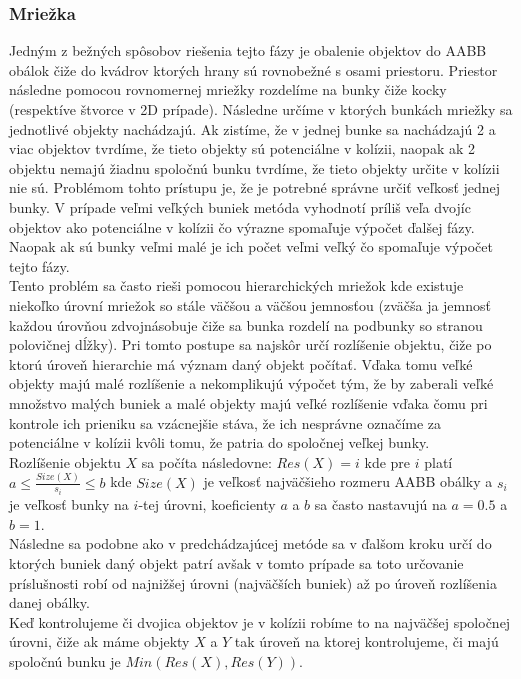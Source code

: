 \documentclass[a4paper]{article}
\begin{document}
	\subsubsection{Mriežka}
	Jedným z bežných spôsobov riešenia tejto fázy je obalenie objektov do AABB obálok čiže do kvádrov ktorých hrany sú rovnobežné s osami priestoru. Priestor následne pomocou rovnomernej mriežky rozdelíme na bunky čiže kocky (respektíve štvorce v 2D prípade). Následne určíme v ktorých bunkách mriežky sa jednotlivé objekty nachádzajú. Ak zistíme, že v jednej bunke sa nachádzajú 2 a viac objektov tvrdíme, že tieto objekty sú potenciálne v kolízii, naopak ak 2 objektu nemajú žiadnu spoločnú bunku tvrdíme, že tieto objekty určite v kolízii nie sú. Problémom tohto prístupu je, že je potrebné správne určiť veľkosť jednej bunky. V prípade veľmi veľkých buniek metóda vyhodnotí príliš veľa dvojíc objektov ako potenciálne v kolízii čo výrazne spomaľuje výpočet ďalšej fázy. Naopak ak sú bunky veľmi malé je ich počet veľmi veľký čo spomaľuje výpočet tejto fázy.
	\\
	
	Tento problém sa často rieši pomocou hierarchických mriežok kde existuje niekoľko úrovní mriežok so stále väčšou a väčšou jemnosťou (zväčša ja jemnosť každou úrovňou zdvojnásobuje čiže sa bunka rozdelí na podbunky so stranou polovičnej dĺžky). Pri tomto postupe sa najskôr určí rozlíšenie objektu, čiže po ktorú úroveň hierarchie má význam daný objekt počítať. Vďaka tomu veľké objekty majú malé rozlíšenie a nekomplikujú výpočet tým, že by zaberali veľké množstvo malých buniek a malé objekty majú veľké rozlíšenie vďaka čomu pri kontrole ich prieniku sa vzácnejšie stáva, že ich nesprávne označíme za potenciálne v kolízii kvôli tomu, že patria do spoločnej veľkej bunky.
	\\
	
	Rozlíšenie objektu $X$ sa počíta následovne: $Res(X) = i$ kde pre $i$ platí $a \leq \frac{Size(X)}{s_i} \leq b$ kde $Size(X)$ je veľkosť najväčšieho rozmeru AABB obálky a $s_i$ je veľkosť bunky na $i$-tej úrovni, koeficienty $a$ a $b$ sa často nastavujú na $a = 0.5$ a $b = 1$.
	\\
	
	Následne sa podobne ako v predchádzajúcej metóde sa v ďalšom kroku určí do ktorých buniek daný objekt patrí avšak v tomto prípade sa toto určovanie príslušnosti robí od najnižšej úrovni (najväčších buniek) až po úroveň rozlíšenia danej obálky. 
	\\
	
	Keď kontrolujeme či dvojica objektov je v kolízii robíme to na najväčšej spoločnej úrovni, čiže ak máme objekty $X$ a $Y$ tak úroveň na ktorej kontrolujeme, či majú spoločnú bunku je $Min(Res(X), Res(Y))$.
	\\
	
\end{document}
